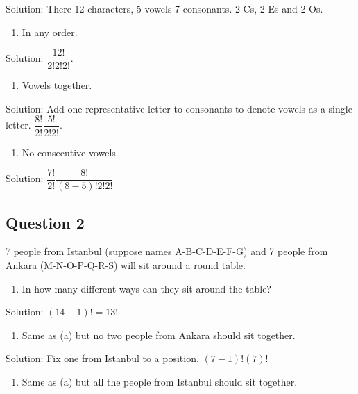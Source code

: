 \documentclass[]{book}
\providecommand{\tightlist}{%
  \setlength{\itemsep}{0pt}\setlength{\parskip}{0pt}}
\theoremstyle{definition}
\theoremstyle{definition}
\theoremstyle{definition}
\theoremstyle{remark}
\begin{document}
Solution: There 12 characters, 5 vowels 7 consonants. 2 Cs, 2 Es and 2
Os.

\begin{enumerate}
\def\labelenumi{\alph{enumi})}
\tightlist
\item
  In any order.
\end{enumerate}

Solution: \(\dfrac{12!}{2!2!2!}\).

\begin{enumerate}
\def\labelenumi{\alph{enumi})}
\setcounter{enumi}{1}
\tightlist
\item
  Vowels together.
\end{enumerate}

Solution: Add one representative letter to consonants to denote vowels
as a single letter. \(\dfrac{8!}{2!}\dfrac{5!}{2!2!}\).

\begin{enumerate}
\def\labelenumi{\alph{enumi})}
\setcounter{enumi}{2}
\tightlist
\item
  No consecutive vowels.
\end{enumerate}

Solution: \(\dfrac{7!}{2!}\dfrac{8!}{(8-5)!2!2!}\)

\hypertarget{question-2}{%
\subsection{Question 2}\label{question-2}}

7 people from Istanbul (suppose names A-B-C-D-E-F-G) and 7 people from
Ankara (M-N-O-P-Q-R-S) will sit around a round table.

\begin{enumerate}
\def\labelenumi{\alph{enumi})}
\tightlist
\item
  In how many different ways can they sit around the table?
\end{enumerate}

Solution: \((14-1)! = 13!\)

\begin{enumerate}
\def\labelenumi{\alph{enumi})}
\setcounter{enumi}{1}
\tightlist
\item
  Same as (a) but no two people from Ankara should sit together.
\end{enumerate}

Solution: Fix one from Istanbul to a position. \((7-1)!(7)!\)

\begin{enumerate}
\def\labelenumi{\alph{enumi})}
\setcounter{enumi}{2}
\tightlist
\item
  Same as (a) but all the people from Istanbul should sit together.
\end{enumerate}
\end{document}
